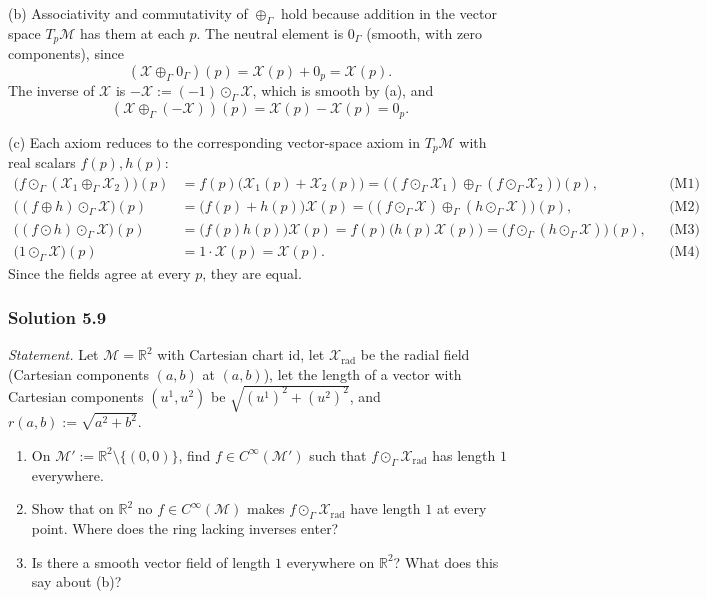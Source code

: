 \documentclass[11pt]{article}
\newcommand{\TpM}{T_p\mathcal M}
\newcommand{\Cinf}{C^\infty(\mathcal M)}
\begin{document}
(b) Associativity and commutativity of $\oplus_\Gamma$ hold because
addition in the vector space $\TpM$ has them at each $p$. The neutral
element is $0_\Gamma$ (smooth, with zero components), since
\[
(\mathcal X\oplus_\Gamma0_\Gamma)(p)=\mathcal X(p)+0_p=\mathcal X(p).
\]
The inverse of $\mathcal X$ is $-\mathcal X:=(-1)\odot_\Gamma\mathcal X$,
which is smooth by (a), and
\[
(\mathcal X\oplus_\Gamma(-\mathcal X))(p)=\mathcal X(p)-\mathcal X(p)=0_p.
\]

(c) Each axiom reduces to the corresponding vector-space axiom in $\TpM$
with real scalars $f(p),h(p)$:
\begin{align*}
\big(f\odot_\Gamma(\mathcal X_1\oplus_\Gamma\mathcal X_2)\big)(p) &= f(p)\big(\mathcal X_1(p)+\mathcal X_2(p)\big)=\big((f\odot_\Gamma\mathcal X_1)\oplus_\Gamma(f\odot_\Gamma\mathcal X_2)\big)(p), && \text{(M1)}\\
\big((f\oplus h)\odot_\Gamma\mathcal X\big)(p) &= \big(f(p)+h(p)\big)\mathcal X(p)=\big((f\odot_\Gamma\mathcal X)\oplus_\Gamma(h\odot_\Gamma\mathcal X)\big)(p), && \text{(M2)}\\
\big((f\odot h)\odot_\Gamma\mathcal X\big)(p) &= \big(f(p)h(p)\big)\mathcal X(p)=f(p)\big(h(p)\mathcal X(p)\big)=\big(f\odot_\Gamma(h\odot_\Gamma\mathcal X)\big)(p), && \text{(M3)}\\
\big(1\odot_\Gamma\mathcal X\big)(p) &= 1\cdot\mathcal X(p)=\mathcal X(p). && \text{(M4)}
\end{align*}
Since the fields agree at every $p$, they are equal.

\subsubsection*{Solution 5.9}

\noindent\textit{Statement.} Let $\mathcal M=\mathbb R^2$ with Cartesian
chart $\mathrm{id}$, let $\mathcal X_{\mathrm{rad}}$ be the radial field
(Cartesian components $(a,b)$ at $(a,b)$), let the length of a vector with
Cartesian components $(u^1,u^2)$ be $\sqrt{(u^1)^2+(u^2)^2}$, and
$r(a,b):=\sqrt{a^2+b^2}$.
\begin{enumerate}[label=(\alph*)]
  \item On $\mathcal M':=\mathbb R^2\setminus\{(0,0)\}$, find
  $f\in C^\infty(\mathcal M')$ such that $f\odot_\Gamma\mathcal
  X_{\mathrm{rad}}$ has length $1$ everywhere.
  \item Show that on $\mathbb R^2$ no $f\in\Cinf$ makes $f\odot_\Gamma
  \mathcal X_{\mathrm{rad}}$ have length $1$ at every point. Where does the
  ring lacking inverses enter?
  \item Is there a smooth vector field of length $1$ everywhere on
  $\mathbb R^2$? What does this say about (b)?
\end{enumerate}
\end{document}
